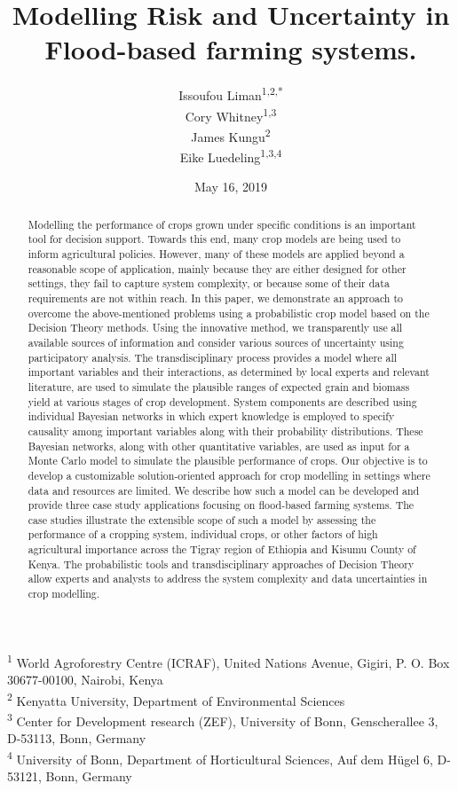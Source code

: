 \documentclass[12pt,oneside]{article}
\title{Modelling Risk and Uncertainty in Flood-based farming systems.}
\author{Issoufou Liman\textsuperscript{1,2,*} \\ Cory Whitney\textsuperscript{1,3} \\ James Kungu\textsuperscript{2} \\ Eike Luedeling\textsuperscript{1,3,4}}
\date{May 16, 2019}
\begin{document}
\maketitle
\begin{abstract}
Modelling the performance of crops grown under specific conditions is an
important tool for decision support. Towards this end, many crop models
are being used to inform agricultural policies. However, many of these
models are applied beyond a reasonable scope of application, mainly
because they are either designed for other settings, they fail to
capture system complexity, or because some of their data requirements
are not within reach. In this paper, we demonstrate an approach to
overcome the above-mentioned problems using a probabilistic crop model
based on the Decision Theory methods. Using the innovative method, we
transparently use all available sources of information and consider
various sources of uncertainty using participatory analysis. The
transdisciplinary process provides a model where all important variables
and their interactions, as determined by local experts and relevant
literature, are used to simulate the plausible ranges of expected grain
and biomass yield at various stages of crop development. System
components are described using individual Bayesian networks in which
expert knowledge is employed to specify causality among important
variables along with their probability distributions. These Bayesian
networks, along with other quantitative variables, are used as input for
a Monte Carlo model to simulate the plausible performance of crops. Our
objective is to develop a customizable solution-oriented approach for
crop modelling in settings where data and resources are limited. We
describe how such a model can be developed and provide three case study
applications focusing on flood-based farming systems. The case studies
illustrate the extensible scope of such a model by assessing the
performance of a cropping system, individual crops, or other factors of
high agricultural importance across the Tigray region of Ethiopia and
Kisumu County of Kenya. The probabilistic tools and transdisciplinary
approaches of Decision Theory allow experts and analysts to address the
system complexity and data uncertainties in crop modelling.
\end{abstract}

{
\hypersetup{linkcolor=black}
\setcounter{tocdepth}{5}
\tableofcontents
}
\textsuperscript{1} World Agroforestry Centre (ICRAF), United Nations
Avenue, Gigiri, P. O. Box 30677-00100, Nairobi, Kenya\\
\textsuperscript{2} Kenyatta University, Department of Environmental
Sciences\\
\textsuperscript{3} Center for Development research (ZEF), University of
Bonn, Genscherallee 3, D-53113, Bonn, Germany\\
\textsuperscript{4} University of Bonn, Department of Horticultural
Sciences, Auf dem Hügel 6, D-53121, Bonn, Germany
\end{document}
